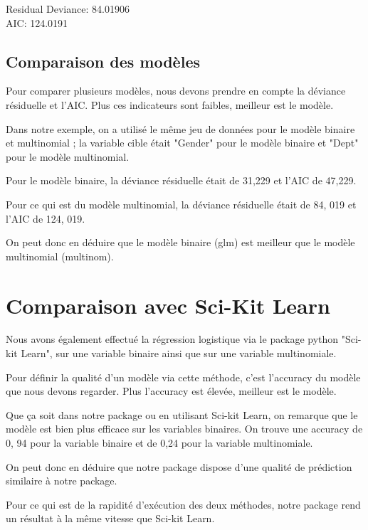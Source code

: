 \documentclass[10pt,french]{report}
\begin{document}
    \begin{flushleft}
    Residual Deviance: 84.01906 \\
    AIC: 124.0191
    \end{flushleft}

    \subsection{Comparaison des modèles}
    
    Pour comparer plusieurs modèles, nous devons prendre en compte la déviance résiduelle et l'AIC. Plus ces indicateurs sont faibles, meilleur est le modèle.

    Dans notre exemple, on a utilisé le même jeu de données pour le modèle binaire et multinomial ; la variable cible était "Gender" pour le modèle binaire et "Dept" pour le modèle multinomial.

    Pour le modèle binaire, la déviance résiduelle était de 31,229 et l'AIC de 47,229.

    Pour ce qui est du modèle multinomial, la déviance résiduelle était de 84, 019 et l'AIC de 124, 019.

    On peut donc en déduire que le modèle binaire (glm) est meilleur que le modèle multinomial (multinom).

    \section{Comparaison avec Sci-Kit Learn}

    Nous avons également effectué la régression logistique via le package python "Sci-kit Learn", sur une variable binaire ainsi que sur une variable multinomiale. 

    Pour définir la qualité d'un modèle via cette méthode, c'est l'accuracy du modèle que nous devons regarder. Plus l'accuracy est élevée, meilleur est le modèle.

    Que ça soit dans notre package ou en utilisant Sci-kit Learn, on remarque que le modèle est bien plus efficace sur les variables binaires. On trouve une accuracy de 0, 94 pour la variable binaire et de 0,24 pour la variable multinomiale.

    On peut donc en déduire que notre package dispose d'une qualité de prédiction similaire à notre package. 

    Pour ce qui est de la rapidité d'exécution des deux méthodes, notre package rend un résultat à la même vitesse que Sci-kit Learn. 
\end{document}
